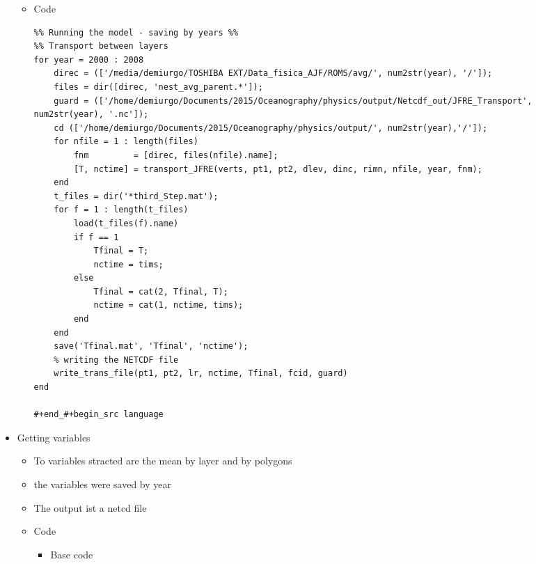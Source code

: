 \documentclass[11pt]{article}
\begin{document}
\begin{itemize}
\begin{itemize}
\item Code\\
\label{sec-4-3-2-2-3-1}%
\begin{verbatim}
%% Running the model - saving by years %%
%% Transport between layers
for year = 2000 : 2008
    direc = (['/media/demiurgo/TOSHIBA EXT/Data_fisica_AJF/ROMS/avg/', num2str(year), '/']);
    files = dir([direc, 'nest_avg_parent.*']);
    guard = (['/home/demiurgo/Documents/2015/Oceanography/physics/output/Netcdf_out/JFRE_Transport', num2str(year), '.nc']);
    cd (['/home/demiurgo/Documents/2015/Oceanography/physics/output/', num2str(year),'/']);
    for nfile = 1 : length(files)
        fnm         = [direc, files(nfile).name];
        [T, nctime] = transport_JFRE(verts, pt1, pt2, dlev, dinc, rimn, nfile, year, fnm);
    end
    t_files = dir('*third_Step.mat');
    for f = 1 : length(t_files)
        load(t_files(f).name)
        if f == 1
            Tfinal = T;
            nctime = tims;
        else
            Tfinal = cat(2, Tfinal, T);
            nctime = cat(1, nctime, tims);
        end
    end
    save('Tfinal.mat', 'Tfinal', 'nctime');
    % writing the NETCDF file
    write_trans_file(pt1, pt2, lr, nctime, Tfinal, fcid, guard)
end

#+end_#+begin_src language
\end{verbatim}

\end{itemize} %

\item Getting variables
\label{sec-4-3-2-2-4}%
\begin{itemize}
\item To variables stracted are the mean by layer and by polygons
\item the variables were saved by year
\item The output ist a netcd file
\end{itemize}
\begin{itemize}

\item Code
\label{sec-4-3-2-2-4-1}%
\begin{itemize}
\item Base code
\end{itemize}



\end{itemize}
\end{itemize}
\end{document}
